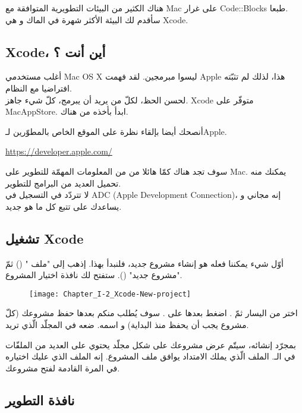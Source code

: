 هناك الكثير من البيئات التطويرية المتوافقة مع
\textenglish{Mac}
على غرار
\textenglish{Code::Blocks}
طبعا.\\
سأقدم لك البيئة الأكثر شهرة في الماك و هي
\textenglish{Xcode}.

\subsection{\textenglish{Xcode}،
 أين أنت ؟}

أغلب مستخدمي
\textenglish{Mac OS X}
ليسوا مبرمجين. لقد فهمت
\textenglish{Apple}
هذا، لذلك لم تثبّته افتراضيا مع النظام.\\
لحسن الحظ، لكلّ من يريد أن يبرمج، كلّ شيء جاهز.
\textenglish{Xcode}
متوفّر على
\textenglish{MacAppStore}.
ابدأ بأخذه من هناك.

أنصحك أيضا بإلقاء نظرة على الموقع الخاص بالمطوّرين لـ\textenglish{Apple}.

\url{https://developer.apple.com/}

سوف تجد هناك كمّا هائلا من من المعلومات المهمّة للتطوير على
\textenglish{Mac}.
يمكنك منه تحميل العديد من البرامج للتطوير.\\
لا تتردّد في التسجيل في
\textenglish{ADC} (\textenglish{Apple Development Connection})،
إنه مجاني و يساعدك على تتبع كل ما هو جديد.

\subsection{تشغيل \textenglish{Xcode}}

أوّل شيء يمكننا فعله هو إنشاء مشروع جديد، فلنبدأ بهذا. إذهب إلى
"ملف "
()
ثمّ
"مشروع جديد"
().
ستفتح لك نافذة اختيار المشروع.

\begin{figure}[H]
	\centering
	\texttt{[image: Chapter\_I-2\_Xcode-New-project]}
\end{figure}

اختر
من اليسار ثمّ
.
اضغط بعدها على
.
سوف يُطلب منكم بعدها حفظ مشروعك (كلّ مشروع يجب أن يحفظ منذ البداية) و اسمه. ضعه في المجلّد الّذي تريد.

بمجرّد إنشائه، سيتّم عرض مشروعك على شكل مجلّد يحتوي على العديد من الملفّات في الـ.
الملف الّذي يملك الامتداد
يوافق ملف المشروع. إنه الملف الذي عليك اختياره في المرة القادمة لفتح مشروعك.

\subsection{نافذة التطوير}

